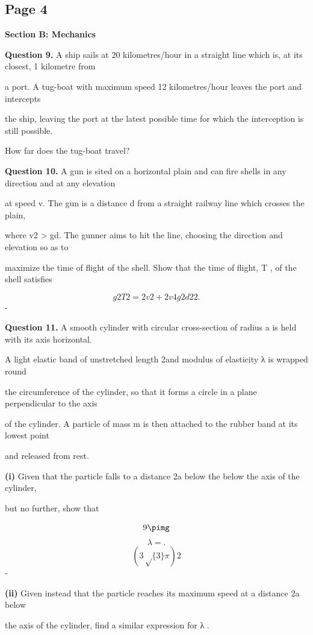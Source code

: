 \documentclass[12pt]{article}
\begin{document}
\subsection*{Page 4}
\begin{flushleft}
\bigskip\textbf{Section B: Mechanics}\par
\bigskip\textbf{Question 9.} A ship sails at 20 kilometres/hour in a straight line which is, at its closest, 1 kilometre from\par
a port. A tug-boat with maximum speed 12 kilometres/hour leaves the port and intercepts\par
the ship, leaving the port at the latest possible time for which the interception is still possible.\par
How far does the tug-boat travel?\par
\bigskip\textbf{Question 10.} A gun is sited on a horizontal plain and can fire shells in any direction and at any elevation\par
at speed v. The gun is a distance d from a straight railway line which crosses the plain,\par
where v2 > gd. The gunner aims to hit the line, choosing the direction and elevation so as to\par
maximize the time of flight of the shell. Show that the time of flight, T , of the shell satisfies\par
\[g 2 T 2 = 2v 2 + 2 v 4 g 2 d 2 2 .\]
-\par
\bigskip\textbf{Question 11.} A smooth cylinder with circular cross-section of radius a is held with its axis horizontal.\par
A light elastic band of unstretched length 2\pia and modulus of elasticity λ is wrapped round\par
the circumference of the cylinder, so that it forms a circle in a plane perpendicular to the axis\par
of the cylinder. A particle of mass m is then attached to the rubber band at its lowest point\par
and released from rest.\par
\textbf{(i)} Given that the particle falls to a distance 2a below the below the axis of the cylinder,\par
but no further, show that\par
\[9\pimg\]
\[λ = .\]
\[(3\sqrt\{3\} \pi)2\]
-\par
\textbf{(ii)} Given instead that the particle reaches its maximum speed at a distance 2a below\par
the axis of the cylinder, find a similar expression for λ .\par
\end{flushleft}
\end{document}
